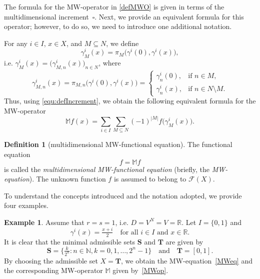 \documentclass{amsart}
\theoremstyle{plain}%
\theoremstyle{definition}
\newtheorem{definition}[theorem]{Definition}
\newtheorem{example}[theorem]{Example}
\theoremstyle{remark}
\begin{document}
The formula for the MW\nobreakdash-operator in \cref{defMWO} is given in terms of the multidimensional increment~$\square$. Next, we provide an equivalent formula for this operator; however, to do so, we need to introduce one additional notation.

For any $i\in I$, $x\in X$, and $M\subseteq N$, we define
\begin{equation}\label{gammaiM}
\gamma^i_M(x)=\pi_M\big(\gamma^i(0),\gamma^i(x)\big),
\end{equation}
i.e. $\gamma^i_M(x)=\big(\gamma^i_{M,n}(x)\big)_{n\in N}$, where 
\begin{equation*}
\gamma^i_{M,n}(x)=\pi_{M,n}\big(\gamma^i(0),\gamma^i(x)\big)=
\left\{
\begin{array}{cl}
\gamma^i_n(0),&\text{if }n\in M,\\
\gamma^i_n(x),&\text{if }n\in N\setminus M.
\end{array}
\right.
\end{equation*} 
Thus, using \eqref{equ:defIncrement}, we obtain the following equivalent formula for the MW-operator 
\begin{equation}\label{equ:MWoperatorDirect}
\mathbb{M}f(x)=\sum_{i\in I}\sum_{M\subseteq N}(-1)^{|M|}f\big(\gamma^i_M(x)\big).
\end{equation}

\begin{definition}[multidimensional MW\nobreakdash-functional equation]\label{defMWE}
The functional equation
\begin{equation*}\label{equ:MWE}
f=\mathbb{M}f  
\end{equation*}
is called the \emph{multidimensional MW\nobreakdash-functional equation} (briefly, the \emph{MW\nobreakdash-equation}). The unknown function $f$ is assumed to belong to $\mathcal{F}(X)$.
\end{definition}

To understand the concepts introduced and the notation adopted, we provide four examples.

\begin{example}\label{M11}
Assume that $r=s=1$, i.e. $D=V^N=V=\mathbb{R}$. Let $I=\{0,1\}$ and 
\begin{equation*}
\gamma^i(x)=\tfrac{x+i}{2}\quad \text{for all }i\in I\text{ and }x\in\mathbb{R}.
\end{equation*}
It is clear that the minimal admissible sets $\textbf{S}$ and $\textbf{T}$ are given by
\begin{equation*}
\textbf{S}=\big\{\tfrac{k}{2^n}:n\in\mathbb{N},k=0,1,\dots,2^n-1\big\}\quad\text{and}\quad 
\textbf{T}=[0,1].
\end{equation*}
By choosing the admissible set $X=\textbf{T}$, we obtain the MW\nobreakdash-equation~\eqref{MWeq} and the corresponding MW\nobreakdash-operator $\mathbb{M}$ given by~\eqref{MWop}.
\end{example}
\end{document}
